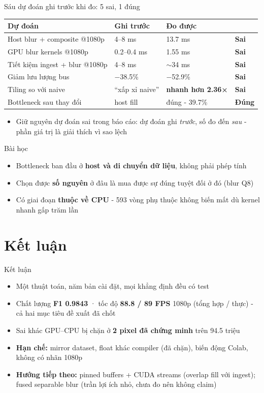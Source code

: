 \documentclass[aspectratio=169,11pt]{beamer}
\newcommand{\kq}[1]{\textcolor{accent}{\textbf{#1}}}
\begin{document}
\begin{frame}{Sáu dự đoán ghi trước khi đo: 5 sai, 1 đúng}
\small
\begin{tabular}{llll}
Dự đoán & Ghi trước & Đo được & \\
\hline
Host blur + composite @1080p & 4--8 ms & 13.7 ms & \kq{Sai} \\
GPU blur kernels @1080p & 0.2--0.4 ms & 1.55 ms & \kq{Sai} \\
Tiết kiệm ingest + blur @1080p & 4--8 ms & $\sim$34 ms & \kq{Sai} \\
Giảm lưu lượng bus & $-$38.5\% & $-$52.9\% & \kq{Sai} \\
Tiling so với naive & ``xấp xỉ naive'' & \textbf{nhanh hơn 2.36×} & \kq{Sai} \\
Bottleneck sau thay đổi & host fill & đúng - 39.7\% & \textcolor{green!50!black}{\textbf{Đúng}} \\
\end{tabular}
\begin{itemize}
  \item Giữ nguyên dự đoán sai trong báo cáo: dự đoán ghi \emph{trước}, số đo đến \emph{sau} - phần giá trị là giải thích vì sao lệch
\end{itemize}
\end{frame}

\begin{frame}{Bài học}
\begin{itemize}
  \item Bottleneck ban đầu ở \textbf{host và di chuyển dữ liệu}, không phải phép tính
  \item Chọn được \textbf{số nguyên} ở đâu là mua được sự đúng tuyệt đối ở đó (blur Q8)
  \item Có giai đoạn \textbf{thuộc về CPU} - 593 vòng phụ thuộc không biến mất dù kernel nhanh gấp trăm lần
\end{itemize}
\end{frame}

\section{Kết luận}

\begin{frame}{Kết luận}
\begin{itemize}
  \item Một thuật toán, năm bản cài đặt, mọi khẳng định đều có test
  \item Chất lượng \kq{F1 0.9843} · tốc độ \kq{88.8 / 89 FPS} 1080p (tổng hợp / thực) - cả hai mục tiêu đề xuất đã chốt
  \item Sai khác GPU--CPU bị chặn ở \kq{2 pixel đã chứng minh} trên 94.5 triệu
  \item \textbf{Hạn chế:} mirror dataset, float khác compiler (đã chặn), biến động Colab, không có nhãn 1080p
  \item \textbf{Hướng tiếp theo:} pinned buffers + CUDA streams (overlap fill với ingest); fused separable blur (trần lợi ích nhỏ, chưa đo nên không claim)
\end{itemize}
\end{frame}
\end{document}
